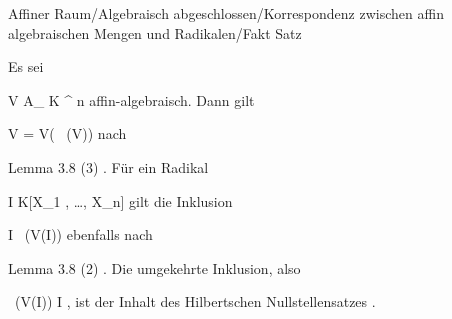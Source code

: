 {Affiner Raum/Algebraisch abgeschlossen/Korrespondenz zwischen affin algebraischen Mengen und Radikalen/Fakt}
{Satz}
{}
{



\faktzusatz {}





}
{





Es sei

\mavergleichskette
{\vergleichskette
{V
}
{ \subseteq }{ { {\mathbb A}_{  K }^{  n   } }
}
{  }{
}
{    }{
}
{   }{
}
}
{}{}{}
affin-algebraisch. Dann gilt

\mavergleichskette
{\vergleichskette
{V
}
{ = }{ V( \, (V))
}
{  }{
}
{    }{
}
{   }{
}
}
{}{}{}
nach

Lemma 3.8  (3)
.
Für ein Radikal

\mavergleichskette
{\vergleichskette
{I
}
{ \subseteq }{ K[X_1 , \ldots ,  X_n]
}
{  }{
}
{    }{
}
{   }{
}
}
{}{}{}
gilt die Inklusion

\mavergleichskette
{\vergleichskette
{I
}
{ \subseteq }{  \, (V(I))
}
{  }{
}
{    }{
}
{   }{
}
}
{}{}{}
ebenfalls nach

Lemma 3.8  (2)
.
Die umgekehrte Inklusion, also

\mavergleichskette
{\vergleichskette
{  \, (V(I))
}
{ \subseteq }{ I
}
{  }{
}
{    }{
}
{   }{
}
}
{}{}{,}
ist der Inhalt
des
Hilbertschen Nullstellensatzes
.




}






